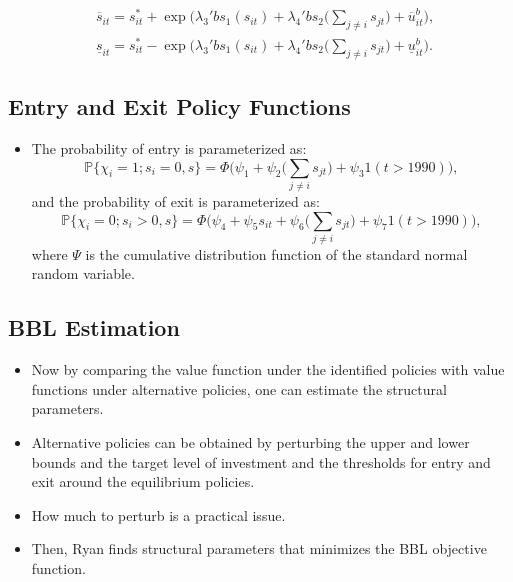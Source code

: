 \documentclass[
]{book}
\providecommand{\tightlist}{%
  \setlength{\itemsep}{0pt}\setlength{\parskip}{0pt}}
\begin{document}
\begin{equation}
\begin{split}
&\overline{s}_{it} = s_{it}^* + \exp\Bigg(\lambda_3' bs_1(s_{it}) + \lambda_4' bs_2\Bigg(\sum_{j \neq i} s_{jt} \Bigg) + \overline{u}_{it}^b \Bigg),\\
&\underline{s}_{it} = s_{it}^* - \exp\Bigg(\lambda_3' bs_1(s_{it}) + \lambda_4' bs_2\Bigg(\sum_{j \neq i} s_{jt} \Bigg) + \underline{u}_{it}^b \Bigg).
\end{split}
\end{equation}

\hypertarget{entry-and-exit-policy-functions}{%
\subsection{Entry and Exit Policy Functions}\label{entry-and-exit-policy-functions}}

\begin{itemize}
\tightlist
\item
  The probability of entry is parameterized as: \begin{equation}
  \mathbb{P}\{\chi_i = 1; s_i = 0, s\} = \Phi\Bigg(\psi_1 + \psi_2\Bigg(\sum_{j \neq i} s_{jt}\Bigg) + \psi_3 1(t > 1990) \Bigg),
  \end{equation} and the probability of exit is parameterized as:
  \begin{equation}
  \mathbb{P}\{\chi_i = 0; s_i > 0, s\} = \Phi\Bigg(\psi_4 + \psi_5 s_{it} + \psi_6 \Bigg(\sum_{j \neq i} s_{jt}\Bigg) + \psi_7 1(t > 1990) \Bigg),
  \end{equation} where \(\Psi\) is the cumulative distribution function
  of the standard normal random variable.
\end{itemize}

\hypertarget{bbl-estimation}{%
\subsection{BBL Estimation}\label{bbl-estimation}}

\begin{itemize}
\tightlist
\item
  Now by comparing the value function under the identified policies
  with value functions under alternative policies, one can estimate
  the structural parameters.
\item
  Alternative policies can be obtained by perturbing the upper and
  lower bounds and the target level of investment and the thresholds
  for entry and exit around the equilibrium policies.
\item
  How much to perturb is a practical issue.
\item
  Then, Ryan finds structural parameters that minimizes the BBL
  objective function.
\end{itemize}
\end{document}
